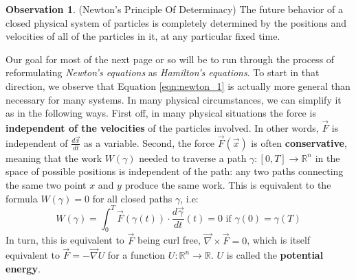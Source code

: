 \documentclass[12pt]{article}
\theoremstyle{definition}
\newtheorem{observation}[theorem]{Observation}
\numberwithin{equation}{section}
\newcommand{\R}{{\mathbb R}}
\begin{document}
\begin{observation} (Newton's Principle Of Determinacy) The future behavior of a closed physical system of particles is completely determined by the positions and velocities of all of the particles in it, at any particular fixed time.
\end{observation}

Our goal for most of the next page or so will be to run through the process of reformulating \emph{Newton's equations} as \emph{Hamilton's equations}. To start in that direction, we observe that Equation \ref{eqn:newton_1} is actually more general than necessary for many systems. In many physical circumstances, we can simplify it as in the following ways. First off, in many physical situations the force is {\bf independent of the velocities} of the particles involved. In other words, $\vec{F}$ is independent of $\frac{d\vec{x}}{dt}$ as a variable. Second, the force $\vec{F}(\vec{x})$ is often {\bf conservative}, meaning that the work $W(\gamma)$ needed to traverse a path $\gamma:[0,T] \to \R^n$ in the space of possible positions is independent of the path: any two paths connecting the same two point $x$ and $y$ produce the same work. This is equivalent to the formula $W(\gamma) = 0$ for all closed paths $\gamma$, i.e:
\[
W(\gamma) = \int_0^T \vec{F}(\gamma(t)) \cdot \frac{d\vec{\gamma}}{dt}(t) = 0 \text{ if }\gamma(0) = \gamma(T)
\]
In turn, this is equivalent to $\vec{F}$ being curl free, $\vec{\nabla} \times \vec{F} = 0$, which is itself equivalent to $\vec{F} = -\vec{\nabla} U$ for a function $U:\R^n \to \R$. $U$ is called the {\bf potential energy}. 
\end{document}

